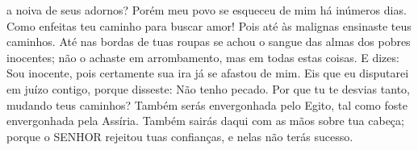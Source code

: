 {{} a noiva de seus adornos? Porém meu povo se esqueceu de mim há inúmeros dias.
Como enfeitas teu caminho para buscar amor! Pois até às malignas ensinaste teus caminhos.
Até nas bordas de tuas roupas se achou o sangue das almas dos pobres inocentes; não o achaste em arrombamento,
 mas em todas estas coisas.
E dizes: Sou inocente, pois certamente sua ira já se afastou de mim. Eis que eu disputarei em juízo contigo, porque disseste: Não tenho pecado.
Por que tu te desvias tanto, mudando teus caminhos? Também serás envergonhada pelo Egito, tal como foste envergonhada pela Assíria.
Também sairás daqui
 com as mãos sobre tua cabeça; porque o SENHOR rejeitou tuas confianças, e nelas não terás sucesso.

\par }

